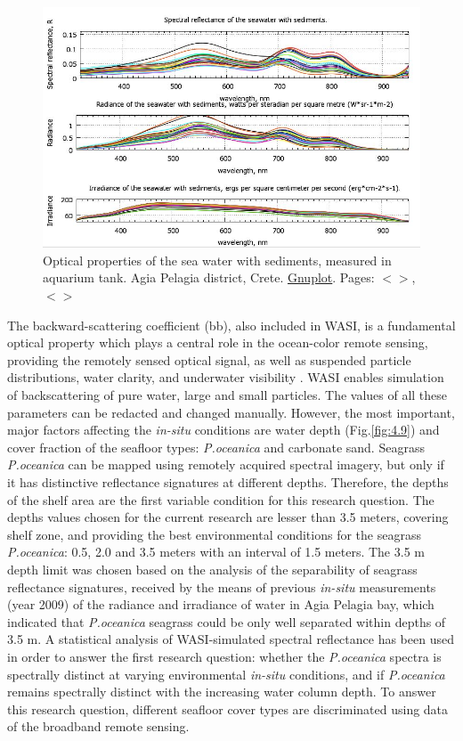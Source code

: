 \documentclass[11pt]{article}
\begin{document}
\begin{figure}[H]
	\centering
	\includegraphics[scale=0.5]{GNU-17.jpg}
	\caption{Optical properties of the sea water with sediments, measured in aquarium tank. Agia Pelagia district, Crete. \href{http://www.gnuplot.info/}{Gnuplot}. Pages: $<$\pageref{page-21}$>$, $<$\pageref{page-31}$>$}\label{fig:4.2}
\end{figure}

The backward-scattering coefficient (bb), also included in \ac{WASI}, is a
fundamental optical property which plays a central role in the ocean-color remote sensing, providing
the remotely sensed optical signal, as well as suspended particle distributions, water clarity, and
underwater visibility \cite{Maffione97}\label{Maffione97}. \ac{WASI} enables simulation of backscattering of pure
water, large and small particles. The values of all these parameters can be redacted and changed
manually. However, the most important, major factors affecting the \textit{in-situ} conditions are water depth (Fig.\ref{fig:4.9})\label{page-32}
and cover fraction of the seafloor types: \textit{P.oceanica} and carbonate sand.
Seagrass \textit{P.oceanica} can be mapped using remotely acquired spectral imagery, but only if it has distinctive
reflectance signatures at different depths. Therefore, the depths of the shelf area are the first variable
condition for this research question. The depths values chosen for the current research are lesser than
3.5 meters, covering shelf zone, and providing the best environmental conditions for the seagrass
\textit{P.oceanica}: 0.5, 2.0 and 3.5 meters with an interval of 1.5 meters. 
The 3.5 m depth limit was chosen based on the analysis of the separability of seagrass reflectance signatures, received by the means of
previous \textit{in-situ} measurements (year 2009) of the radiance and irradiance of water in Agia Pelagia
bay, which indicated that \textit{P.oceanica} seagrass could be only well separated within depths of 3.5 m.
A statistical analysis of \ac{WASI}-simulated spectral reflectance has been used in order to answer the first
research question: whether the \textit{P.oceanica} spectra is spectrally distinct at varying environmental \textit{in-situ}
conditions, and if \textit{P.oceanica} remains spectrally distinct with the increasing water column depth.
To answer this research question, different seafloor cover types are discriminated using data of the
broadband remote sensing.
\end{document}
